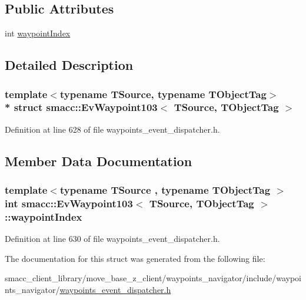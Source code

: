 \subsection*{Public Attributes}
\begin{DoxyCompactItemize}
\item 
int \hyperlink{structsmacc_1_1EvWaypoint103_ab36e8527e2bc49355eb3ed11ff7c4ef4}{waypoint\+Index}
\end{DoxyCompactItemize}


\subsection{Detailed Description}
\subsubsection*{template$<$typename T\+Source, typename T\+Object\+Tag$>$\\*
struct smacc\+::\+Ev\+Waypoint103$<$ T\+Source, T\+Object\+Tag $>$}



Definition at line 628 of file waypoints\+\_\+event\+\_\+dispatcher.\+h.



\subsection{Member Data Documentation}
\subsubsection[{\texorpdfstring{waypoint\+Index}{waypointIndex}}]{\setlength{\rightskip}{0pt plus 5cm}template$<$typename T\+Source , typename T\+Object\+Tag $>$ int {\bf smacc\+::\+Ev\+Waypoint103}$<$ T\+Source, T\+Object\+Tag $>$\+::waypoint\+Index}\hypertarget{structsmacc_1_1EvWaypoint103_ab36e8527e2bc49355eb3ed11ff7c4ef4}{}\label{structsmacc_1_1EvWaypoint103_ab36e8527e2bc49355eb3ed11ff7c4ef4}


Definition at line 630 of file waypoints\+\_\+event\+\_\+dispatcher.\+h.



The documentation for this struct was generated from the following file\+:\begin{DoxyCompactItemize}
\item 
smacc\+\_\+client\+\_\+library/move\+\_\+base\+\_\+z\+\_\+client/waypoints\+\_\+navigator/include/waypoints\+\_\+navigator/\hyperlink{waypoints__event__dispatcher_8h}{waypoints\+\_\+event\+\_\+dispatcher.\+h}\end{DoxyCompactItemize}
